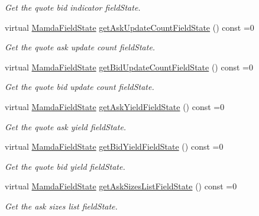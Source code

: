 \begin{CompactItemize}
\begin{CompactList}\small\item\em Get the quote bid indicator field\-State. \item\end{CompactList}\item 
virtual \hyperlink{namespaceWombat_93aac974f2ab713554fd12a1fa3b7d2a}{Mamda\-Field\-State} \hyperlink{classWombat_1_1MamdaQuoteUpdate_a00f737c0e8b356fb5b9a56e4c02ae98}{get\-Ask\-Update\-Count\-Field\-State} () const =0
\begin{CompactList}\small\item\em Get the quote ask update count field\-State. \item\end{CompactList}\item 
virtual \hyperlink{namespaceWombat_93aac974f2ab713554fd12a1fa3b7d2a}{Mamda\-Field\-State} \hyperlink{classWombat_1_1MamdaQuoteUpdate_896f9662777d9612562a1d5aa4d6afd3}{get\-Bid\-Update\-Count\-Field\-State} () const =0
\begin{CompactList}\small\item\em Get the quote bid update count field\-State. \item\end{CompactList}\item 
virtual \hyperlink{namespaceWombat_93aac974f2ab713554fd12a1fa3b7d2a}{Mamda\-Field\-State} \hyperlink{classWombat_1_1MamdaQuoteUpdate_8ab3bd8d0aaccb6c6361ad5efb17a996}{get\-Ask\-Yield\-Field\-State} () const =0
\begin{CompactList}\small\item\em Get the quote ask yield field\-State. \item\end{CompactList}\item 
virtual \hyperlink{namespaceWombat_93aac974f2ab713554fd12a1fa3b7d2a}{Mamda\-Field\-State} \hyperlink{classWombat_1_1MamdaQuoteUpdate_3f5d0b6f16d212b531345f64d6a37129}{get\-Bid\-Yield\-Field\-State} () const =0
\begin{CompactList}\small\item\em Get the quote bid yield field\-State. \item\end{CompactList}\item 
virtual \hyperlink{namespaceWombat_93aac974f2ab713554fd12a1fa3b7d2a}{Mamda\-Field\-State} \hyperlink{classWombat_1_1MamdaQuoteUpdate_b76f1d1d4a835b6119d09549699ed243}{get\-Ask\-Sizes\-List\-Field\-State} () const =0
\begin{CompactList}\small\item\em Get the ask sizes list field\-State. \item\end{CompactList}\item 

\end{CompactItemize}
